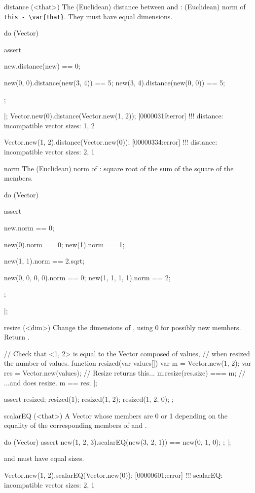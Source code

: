 \begin{urbiscriptapi}
\item[distance](<that>)%
  The (Euclidean) distance between \this and \that: (Euclidean) norm of
  \lstinline|this - \var{that}|.  They must have equal dimensions.
\begin{urbiscript}
do (Vector)
{
  assert
  {
    new.distance(new) == 0;

    new(0, 0).distance(new(3, 4)) == 5;
    new(3, 4).distance(new(0, 0)) == 5;
  };
}|;
Vector.new(0).distance(Vector.new(1, 2));
[00000319:error] !!! distance: incompatible vector sizes: 1, 2

Vector.new(1, 2).distance(Vector.new(0));
[00000334:error] !!! distance: incompatible vector sizes: 2, 1
\end{urbiscript}

\item[norm]%
  The (Euclidean) norm of \this: square root of the sum of the square of the
  members.
\begin{urbiscript}
do (Vector)
{
  assert
  {
    new.norm == 0;

    new(0).norm == 0;
    new(1).norm == 1;

    new(1, 1).norm == 2.sqrt;

    new(0, 0, 0, 0).norm == 0;
    new(1, 1, 1, 1).norm == 2;
  };
}|;
\end{urbiscript}

\item[resize](<dim>)%
  Change the dimensions of \this, using 0 for possibly new members.  Return
  \this.
\begin{urbiscript}
// Check that <1, 2> is equal to the Vector composed of values,
// when resized the number of values.
function resized(var values[])
{
  var m = Vector.new(1, 2);
  var res = Vector.new(values);
  // Resize returns this...
  m.resize(res.size) === m;
  // ...and does resize.
  m == res;
}|;

assert
{
  resized;
  resized(1);
  resized(1, 2);
  resized(1, 2, 0);
};
\end{urbiscript}

\item[scalarEQ](<that>)%
  A Vector whose members are 0 or 1 depending on the equality of the
  corresponding members of \this and \that.
\begin{urbiscript}
do (Vector)
{
  assert
  {
    new(1, 2, 3).scalarEQ(new(3, 2, 1)) == new(0, 1, 0);
  };
}|;
\end{urbiscript}
  \this and \that must have equal sizes.
\begin{urbiscript}
Vector.new(1, 2).scalarEQ(Vector.new(0));
[00000601:error] !!! scalarEQ: incompatible vector sizes: 2, 1
\end{urbiscript}


\end{urbiscriptapi}
